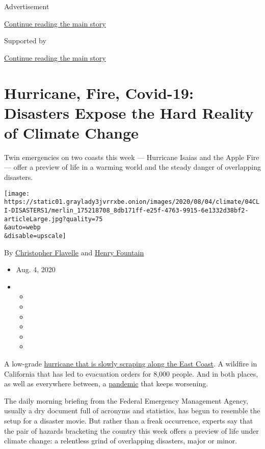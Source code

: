 Advertisement

\protect\hyperlink{after-top}{Continue reading the main story}

Supported by

\protect\hyperlink{after-sponsor}{Continue reading the main story}

\hypertarget{hurricane-fire-covid-19-disasters-expose-the-hard-reality-of-climate-change}{%
\section{Hurricane, Fire, Covid-19: Disasters Expose the Hard Reality of
Climate
Change}\label{hurricane-fire-covid-19-disasters-expose-the-hard-reality-of-climate-change}}

Twin emergencies on two coasts this week --- Hurricane Isaias and the
Apple Fire --- offer a preview of life in a warming world and the steady
danger of overlapping disasters.

\texttt{[image: https://static01.graylady3jvrrxbe.onion/images/2020/08/04/climate/04CLI-DISASTERS1/merlin\_175218708\_8db171ff-e25f-4763-9915-6e1332d38bf2-articleLarge.jpg?quality=75\\\&auto=webp\\\&disable=upscale]}

By
\href{https://www.nytimes3xbfgragh.onion/by/christopher-flavelle}{Christopher
Flavelle} and
\href{https://www.nytimes3xbfgragh.onion/by/henry-fountain}{Henry
Fountain}

\begin{itemize}
\item
  Aug. 4, 2020
\item
  \begin{itemize}
  \item
  \item
  \item
  \item
  \item
  \item
  \end{itemize}
\end{itemize}

A low-grade
\href{https://www.nytimes3xbfgragh.onion/2020/08/04/us/isaias-storm-updates.html}{hurricane
that is slowly scraping along the East Coast}. A wildfire in California
that has led to evacuation orders for 8,000 people. And in both places,
as well as everywhere between, a
\href{https://www.nytimes3xbfgragh.onion/interactive/2020/world/coronavirus-maps.html}{pandemic}
that keeps worsening.

The daily morning briefing from the Federal Emergency Management Agency,
usually a dry document full of acronyms and statistics, has begun to
resemble the setup for a disaster movie. But rather than a freak
occurrence, experts say that the pair of hazards bracketing the country
this week offers a preview of life under climate change: a relentless
grind of overlapping disasters, major or minor.


